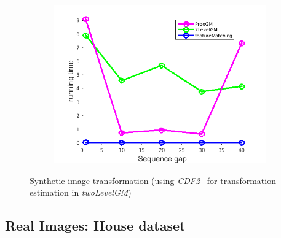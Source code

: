 \begin{figure}[h]
\begin{subfigure}[b]{0.3\textwidth}
		\includegraphics[scale=0.25]{"chapter3/fig/ImageTrafo/anchor_descr/using_cpd_afftrafo/performance/time"}  
	\end{subfigure} 	
	\caption{Synthetic image transformation (using \emph{CDF2}~\cite{Myronenko2009_CPD} for transformation estimation in \emph{twoLevelGM})}
\end{figure}
\FloatBarrier


\subsection{Real Images: House dataset}

